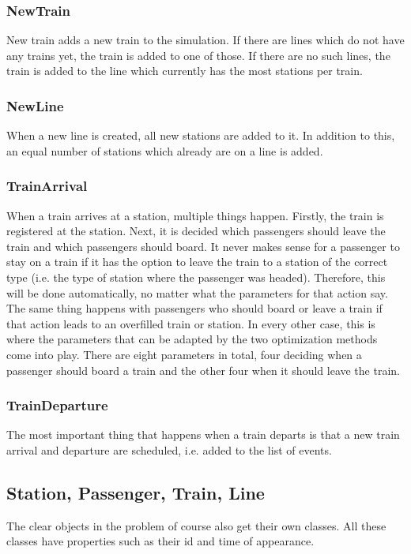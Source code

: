\documentclass[10pt]{scrreprt}
\begin{document}
\subsubsection{NewTrain}
New train adds a new train to the simulation. If there are lines which do not have any trains yet, the train is added to one of those. If there are no such lines, the train is added to the line which currently has the most stations per train.

\subsubsection{NewLine}
When a new line is created, all new stations are added to it. In addition to this, an equal number of stations which already are on a line is added.

\subsubsection{TrainArrival}
When a train arrives at a station, multiple things happen. Firstly, the train is registered at the station. Next, it is decided which passengers should leave the train and which passengers should board. It never makes sense for a passenger to stay on a train if it has the option to leave the train to a station of the correct type (i.e. the type of station where the passenger was headed). Therefore, this will be done automatically, no matter what the parameters for that action say. The same thing happens with passengers who should board or leave a train if that action leads to an overfilled train or station. In every other case, this is where the parameters that can be adapted by the two optimization methods come into play. There are eight parameters in total, four deciding when a passenger should board a train and the other four when it should leave the train.

\subsubsection{TrainDeparture}
The most important thing that happens when a train departs is that a new train arrival and departure are scheduled, i.e. added to the list of events.


\subsection{Station, Passenger, Train, Line}
The clear objects in the problem of course also get their own classes. All these classes have properties such as their id and time of appearance.
\end{document}
